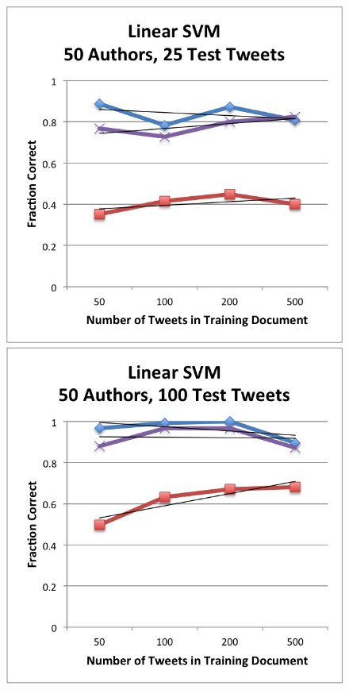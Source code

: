 \documentclass[pageno]{jpaper}
\begin{document}
\begin{figure}[h!]
\begin{center}
\includegraphics*[scale=.75]{LinearSVMVaryTrain50Auth25Test}
\includegraphics*[scale=.75]{LinearSVMVaryTrain50Auth100Test}

\end{center}
\end{figure}
\end{document}
